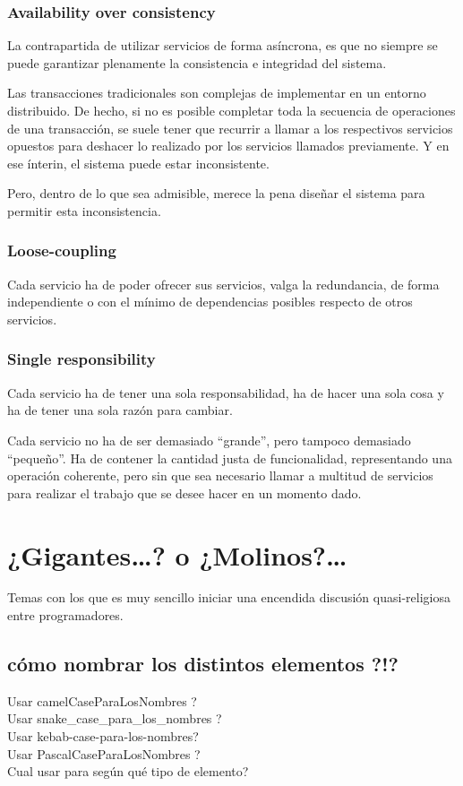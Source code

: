 \documentclass[spanish,12pt,a4paper,final,oneside]{book}
\begin{document}
\subsection{\textbf{A}vailability over consistency}

La contrapartida de utilizar servicios de forma asíncrona, es que no siempre se puede garantizar plenamente la consistencia e integridad del sistema.

Las transacciones tradicionales son complejas de implementar en un entorno distribuido. De hecho, si no es posible completar toda la secuencia de operaciones de una transacción, se suele tener que recurrir a llamar a los respectivos servicios opuestos para deshacer lo realizado por los servicios llamados previamente. Y en ese ínterin, el sistema puede estar inconsistente.

Pero, dentro de lo que sea admisible, merece la pena diseñar el sistema para permitir esta inconsistencia.

\subsection{\textbf{L}oose-coupling}

Cada servicio ha de poder ofrecer sus servicios, valga la redundancia, de forma independiente o con el mínimo de dependencias posibles respecto de otros servicios.

\subsection{\textbf{S}ingle responsibility}

Cada servicio ha de tener una sola responsabilidad, ha de hacer una sola cosa y ha de tener una sola razón para cambiar.

Cada servicio no ha de ser demasiado ``grande'', pero tampoco demasiado ``pequeño''. Ha de contener la cantidad justa de funcionalidad,  representando una operación coherente, pero sin que sea necesario llamar a multitud de servicios para realizar el trabajo que se desee hacer en un momento dado.


\chapter{¿Gigantes\ldots? o ¿Molinos?\ldots}
Temas con los que es muy sencillo iniciar una encendida discusión quasi-religiosa entre programadores. 

\section{cómo nombrar los distintos elementos ?!?}
Usar camelCaseParaLosNombres ?
\\Usar snake\_case\_para\_los\_nombres ?
\\Usar kebab-case-para-los-nombres?
\\Usar PascalCaseParaLosNombres ?
\\Cual usar para según qué tipo de elemento?
\end{document}
